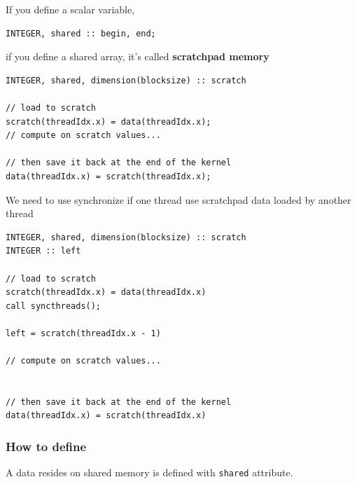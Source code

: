 If you define a scalar variable, 
\begin{lstlisting}
INTEGER, shared :: begin, end;
\end{lstlisting}
if you define a shared array, it's called {\bf scratchpad memory}
\begin{lstlisting}
INTEGER, shared, dimension(blocksize) :: scratch

// load to scratch
scratch(threadIdx.x) = data(threadIdx.x);
// compute on scratch values...

// then save it back at the end of the kernel
data(threadIdx.x) = scratch(threadIdx.x);
\end{lstlisting}
We need to use synchronize if one thread use scratchpad data loaded by
another thread
\begin{lstlisting}
INTEGER, shared, dimension(blocksize) :: scratch
INTEGER :: left

// load to scratch
scratch(threadIdx.x) = data(threadIdx.x)
call syncthreads();

left = scratch(threadIdx.x - 1)

// compute on scratch values...


// then save it back at the end of the kernel
data(threadIdx.x) = scratch(threadIdx.x)
\end{lstlisting}

\subsubsection{How to define}
\label{sec:how-define-3}

A data resides on shared memory is defined with
\verb.shared. attribute.

